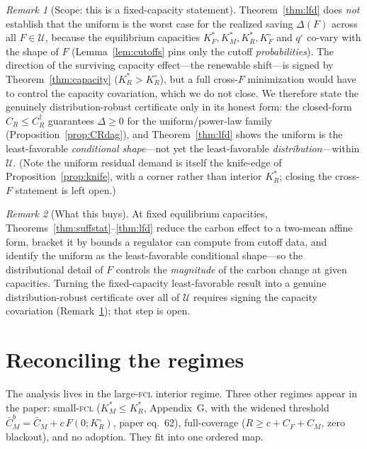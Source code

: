 \documentclass[11pt,reqno]{amsart}
\theoremstyle{plain}
\theoremstyle{definition}
\theoremstyle{remark}
\newtheorem{remark}{Remark}
\newcommand{\KRs}{K_R^{*}}
\newcommand{\KFs}{K_F^{*}}
\newcommand{\KMs}{K_M^{*}}
\newcommand{\KRo}{K_R^{\circ}}
\newcommand{\KFo}{K_F^{\circ}}
\newcommand{\CM}{C_M}
\newcommand{\CF}{C_F}
\newcommand{\CR}{C_R}
\newcommand{\CMbar}{\bar C_M}
\newcommand{\Ucal}{\mathcal U}
\begin{document}
\begin{remark}[Scope: this is a fixed-capacity statement]\label{rem:lfd}
Theorem~\ref{thm:lfd} does \emph{not} establish that the uniform is the worst case
for the realized saving $\Delta(F)$ across all $F\in\Ucal$, because the equilibrium
capacities $\KFs,\KMs,\KRs,\KFo$ and $q^{\circ}$ co-vary with the shape of $F$
(Lemma~\ref{lem:cutoffs} pins only the cutoff \emph{probabilities}). The direction
of the surviving capacity effect---the renewable shift---is signed by
Theorem~\ref{thm:capacity} ($\KRs>\KRo$), but a full cross-$F$ minimization would
have to control the capacity covariation, which we do not close. We therefore
state the genuinely distribution-robust certificate only in its honest form: the
closed-form $\CR\le\CR^{\dagger}$ guarantees $\Delta\ge0$ for the uniform/power-law
family (Proposition~\ref{prop:CRdag}), and Theorem~\ref{thm:lfd} shows the uniform
is the least-favorable \emph{conditional shape}---not yet the least-favorable
\emph{distribution}---within $\Ucal$. (Note the uniform residual demand is itself
the knife-edge of Proposition~\ref{prop:knife}, with a corner rather than interior
$\KRs$; closing the cross-$F$ statement is left open.)
\end{remark}

\begin{remark}[What this buys]
At fixed equilibrium capacities, Theorems~\ref{thm:suffstat}--\ref{thm:lfd} reduce
the carbon effect to a two-mean affine form, bracket it by bounds a regulator can
compute from cutoff data, and identify the uniform as the least-favorable
conditional shape---so the distributional detail of $F$ controls the
\emph{magnitude} of the carbon change at given capacities. Turning the
fixed-capacity least-favorable result into a genuine distribution-robust
certificate over all of $\Ucal$ requires signing the capacity covariation
(Remark~\ref{rem:lfd}); that step is open.
\end{remark}

\section{Reconciling the regimes}\label{sec:regimes}

The analysis lives in the large-\textsc{fcl} interior regime. Three other regimes
appear in the paper: small-\textsc{fcl} ($\KMs\le\KRs$, Appendix~G, with the
widened threshold $\CMbar^{b}=\CMbar+c\,F(0;\KRo)$, paper eq.\ 62), full-coverage
($R\ge c+\CF+\CM$, zero blackout), and no adoption. They fit into one ordered map.
\end{document}
